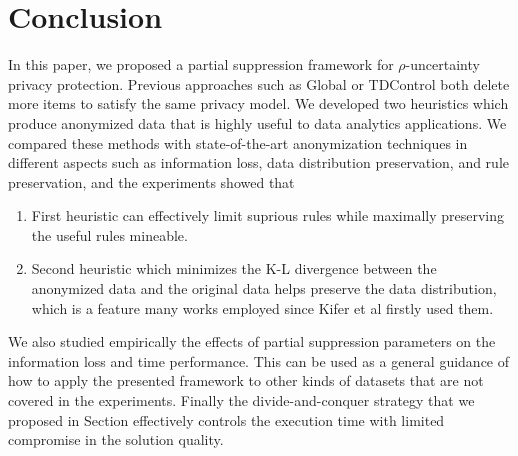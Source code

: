 \section{Conclusion}
\label{sec:conclude}
In this paper, we proposed a partial suppression framework for
$\rho$-uncertainty privacy protection. Previous approaches such as
Global  or TDControl both delete more items to satisfy the same privacy model. We developed two heuristics which produce anonymized data that is highly useful to data analytics applications.
We compared these methods with state-of-the-art anonymization techniques
in different aspects such as information loss, data distribution preservation, and rule preservation, and the experiments showed that
\begin{enumerate}
\item First heuristic can effectively limit suprious rules while
maximally preserving the useful rules mineable.
\item Second heuristic which minimizes the K-L divergence between the
anonymized data and the original data helps preserve the data distribution,
which is a feature many works employed since Kifer et al \cite{Kifer:l-diversity} firstly used them.
\end{enumerate}
We also studied empirically the effects of partial suppression parameters
on the information loss and time performance.
This can be used as a general guidance of how to apply the presented framework to other kinds of datasets that are not covered in the experiments. Finally the divide-and-conquer strategy that we proposed in 
Section 
effectively controls the execution time with limited compromise in the solution quality.
